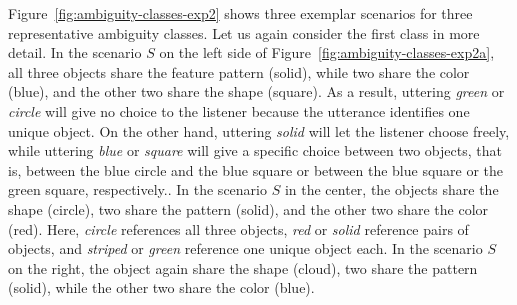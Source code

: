 \documentclass[10pt,a4paper]{article}
\begin{document}
Figure~\ref{fig:ambiguity-classes-exp2} shows three exemplar scenarios for three representative  ambiguity classes. 
Let us again consider the first class in more detail.
In the scenario $S$ on the left side of Figure~\ref{fig:ambiguity-classes-exp2a}, 
all three objects share the feature pattern (solid), while two share the color (blue), and the other two share the shape (square).
As a result, uttering \textit{green} or \textit{circle} will give no choice to the listener because the utterance identifies one unique object. 
On the other hand, uttering \textit{solid} will let the listener choose freely, while uttering \textit{blue} or \textit{square} will give a specific choice between two objects, that is, between the blue circle and the blue square or between the blue square or the green square, respectively..
In the scenario $S$ in the center, the objects share the shape (circle), two share the pattern (solid), and the other two share the color (red).
Here, \textit{circle} references all three objects, \textit{red} or \textit{solid} reference pairs of objects, and \textit{striped} or \textit{green} reference one unique object each.
In the scenario $S$ on the right, the object again share the shape (cloud), two share the pattern (solid), while the other two share the color (blue).
\end{document}

